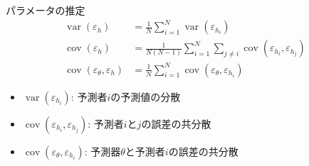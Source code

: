 \documentclass[dvipdfmx,aspectratio=169]{beamer}
\DeclareMathOperator{\var}{var}
\DeclareMathOperator{\cov}{cov}
\newcommand{\varh}{\var(\varepsilon_h)}
\newcommand{\covh}{\cov(\varepsilon_h)}
\newcommand{\covmh}{\cov(\varepsilon_\theta, \varepsilon_h)}
\begin{document}
\begin{frame}{パラメータの推定}
\begin{align*}
  \varh &= \frac{1}{N}\sum_{i=1}^N\var(\varepsilon_{h_i}) \\
  \covh &= \frac{1}{N(N - 1)}\sum_{i=1}^N\sum_{j \neq i}\cov(\varepsilon_{h_i}, \varepsilon_{h_j}) \\
  \covmh &= \frac{1}{N}\sum_{i=1}^N\cov(\varepsilon_\theta, \varepsilon_{h_i})
\end{align*}
\begin{itemize}
  \item $\var(\varepsilon_{h_i})$: 予測者$i$の予測値の分散
  \item $\cov(\varepsilon_{h_i}, \varepsilon_{h_j})$: 予測者$i$と$j$の誤差の共分散
  \item $\cov(\varepsilon_{\theta}, \varepsilon_{h_i})$: 予測器$\theta$と予測者$i$の誤差の共分散
\end{itemize}
\end{frame}
\end{document}
